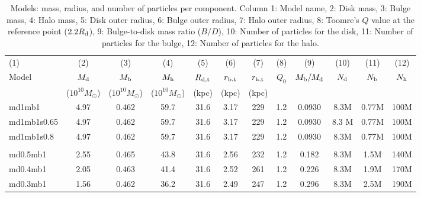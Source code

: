 \begin{table*}
\begin{center}
  \caption{Models: mass, radius, and number of particles per component.
    Column 1: Model name, 2: Disk mass, 3: Bulge mass, 4: Halo mass, 5: Disk outer radius, 6: Bulge outer radius, 7: Halo outer radius, 
8: Toomre's $Q$ value at the reference point ($2.2R_{\rm d}$), 
9: Bulge-to-disk mass ratio ($B/D$), 10: Number of particles for the disk, 11:  Number of particles for the bulge, 12: Number of particles for the halo.
\label{tb:mass_radius}}
\begin{tabular}{lccccccccccc}
\hline
  (1)      &   (2)      &   (3)      &   (4)      &   (5)      &   (6)      &   (7)      &   (8)      &   (9)      &   (10)      &   (11)      &   (12)      \\ 
Model    & $M_{\rm d}$ & $M_{\rm b}$ & $M_{\rm h}$ & $R_{\rm d, t}$ & $r_{\rm b, t}$ & $r_{\rm h, t}$ & $Q_0$   &  $M_{\rm b}/M_{\rm d}$ & $N_{\rm d}$ & $N_{\rm b}$ & $N_{\rm h}$\\ 
   & ($10^{10}M_{\odot}$) & ($10^{10}M_{\odot}$) & ($10^{10}M_{\odot}$) & (kpc) & (kpc) & (kpc) &  &   &  &  & \\ 
\hline  \hline
md1mb1       & 4.97 &  0.462 & 59.7 & 31.6 & 3.17 & 229 & 1.2  & 0.0930 & 8.3M & 0.77M & 100M \\%
md1mb1s0.65       & 4.97 &  0.462 & 59.7 & 31.6 & 3.17 & 229 & 1.2   & 0.0930 & 8.3 M & 0.77M & 100M \\%
md1mb1s0.8       & 4.97 &  0.462 & 59.7 & 31.6 & 3.17 & 229 & 1.2  & 0.0930 & 8.3M & 0.77M & 100M \\%
\\
md0.5mb1      & 2.55 &  0.465 & 43.8 & 31.6 & 2.56 & 232 & 1.2  & 0.182  & 8.3M & 1.5M & 140M \\%
md0.4mb1      & 2.05 &  0.463 & 41.4 & 31.6 & 2.52 & 261 & 1.2  & 0.226 & 8.3M & 1.9M & 170M \\%
md0.3mb1      & 1.56 &  0.462 & 36.2 & 31.6 & 2.49 & 247 & 1.2 & 0.296 & 8.3M & 2.5M & 190M \\%

\end{tabular}
\end{center}
\end{table*}
